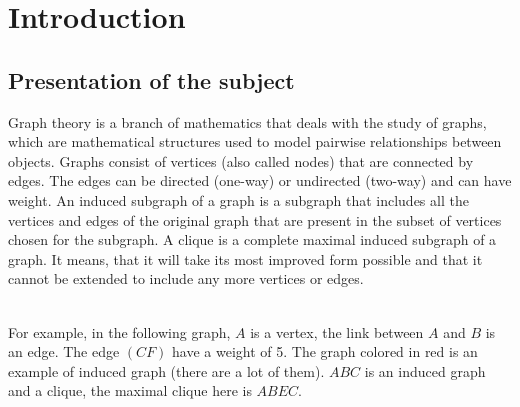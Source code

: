 
\section{Introduction}

\subsection{Presentation of the subject}

    Graph theory is a branch of mathematics that deals with the study of graphs, which are mathematical structures used to model pairwise relationships between objects. Graphs consist of vertices (also called nodes) that are connected by edges. The edges can be directed (one-way) or undirected (two-way) and can have weight. An induced subgraph of a graph is a subgraph that includes all the vertices and edges of the original graph that are present in the subset of vertices chosen for the subgraph. A clique is a complete maximal induced subgraph of a graph. It means, that it will take its most improved form possible and that it cannot be extended to include any more vertices or edges.
    \\ \\
    \begin{minipage}{0.5\textwidth}
        For example, in the following graph, $A$ is a vertex, the link between $A$ and $B$ is an edge. The edge $(CF)$ have a weight of 5. The graph colored in red is an example of induced graph (there are a lot of them). $ABC$ is an induced graph and a clique, the maximal clique here is $ABEC$. 
    \end{minipage}
    \begin{minipage}{0.5\textwidth}
        \begin{center}
        \end{center}
    \end{minipage}
